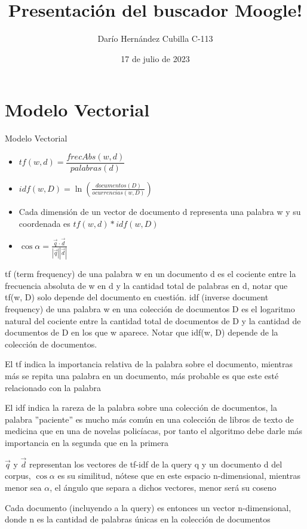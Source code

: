 \documentclass{beamer}
\begin{document}
\title{Presentación del buscador Moogle!}
\author{Darío Hernández Cubilla C-113}
\date{17 de julio de 2023}
\maketitle

\section{Modelo Vectorial}

\begin{frame}{Modelo Vectorial}

\begin{itemize}
    \item<1-> $ \displaystyle tf(w, d) = \dfrac{frecAbs(w, d)}{palabras(d)}$
    \item<2-> $ \displaystyle idf(w, D) = \ln(\frac{documentos(D)}{ocurrencias(w, D)}) $
    \item <3-> Cada dimensión de un vector de documento d representa una palabra w y su coordenada es $ tf(w, d) * idf(w, D)$ 
    \item<5-> $ \displaystyle \cos{\alpha} = \frac{\vec{q}\cdot\vec{d}}{\left\lvert \vec{q} \right\rvert \left\lvert {\vec{d}} \right\rvert }$
             
\end{itemize}

{
    tf (term frequency) de una palabra w en un documento d es el cociente entre la frecuencia absoluta de w en d
    y la cantidad total de palabras en d, notar que tf(w, D) solo depende del documento en cuestión.
}
{
    idf (inverse document frequency) de una palabra w en una colección de documentos D es el logaritmo
    natural del cociente entre la cantidad total de documentos de D y la cantidad de documentos de D 
    en los que w aparece. Notar que idf(w, D) depende de la colección de documentos.
}

{
    El tf indica la importancia relativa de la palabra sobre el documento, mientras más se repita una
    palabra en un documento, más probable es que este esté relacionado con la palabra
}

{
    El idf indica la rareza de la palabra sobre una colección de documentos, la palabra ''paciente'' es
    mucho más común en una colección de libros de texto de medicina que en una de novelas policíacas, por
    tanto el algoritmo debe darle más importancia en la segunda que en la primera
}

{
    $\vec{q}$ y $\vec{d}$ representan los vectores de tf-idf de la query q y un documento d del corpus,
    $\cos{\alpha}$ es su similitud, nótese que en este espacio n-dimensional, mientras menor sea $\alpha$,
    el ángulo que separa a dichos vectores, menor será su coseno
}

{
    Cada documento (incluyendo a la query) es entonces un vector n-dimensional, donde n es la cantidad
    de palabras únicas en la colección de documentos
}

\end{frame}
\end{document}
